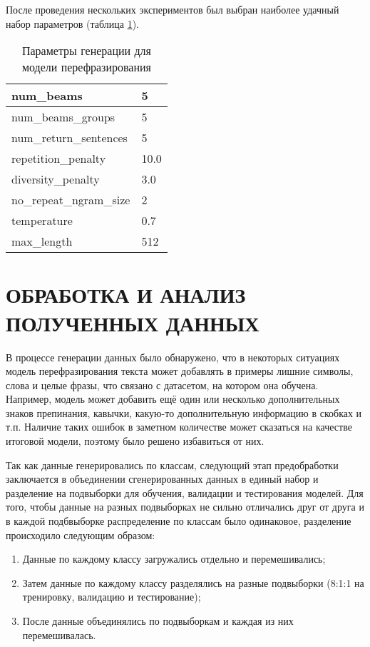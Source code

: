 После проведения нескольких экспериментов был выбран наиболее удачный набор параметров (таблица \ref{tab1:table}).

\begin{table}[H]
   \captionsetup{format=hang, singlelinecheck=false}
   \raggedleft
      \caption{Параметры генерации для модели перефразирования}
      \label{tab1:table}
   \centering        
   \begin{tabular}{|p{10cm}|p{5cm}|}
      \hline
      num\_beams & 5 \\
      \hline
      num\_beams\_groups & 5 \\
      \hline
      num\_return\_sentences & 5 \\
      \hline
      repetition\_penalty & 10.0 \\
      \hline
      diversity\_penalty & 3.0 \\
      \hline
      no\_repeat\_ngram\_size & 2 \\
      \hline
      temperature & 0.7 \\
      \hline
      max\_length & 512 \\
      \hline
   \end{tabular}
\end{table}

\section{ОБРАБОТКА И АНАЛИЗ ПОЛУЧЕННЫХ ДАННЫХ}
В процессе генерации данных было обнаружено, что в некоторых ситуациях модель перефразирования текста может добавлять в примеры лишние символы, 
слова и целые фразы, что связано с датасетом, на котором она обучена. Например, модель может добавить ещё один или несколько дополнительных 
знаков препинания, кавычки, какую-то дополнительную информацию в скобках и т.п. Наличие таких ошибок в заметном количестве может сказаться на 
качестве итоговой модели, поэтому было решено избавиться от них.

Так как данные генерировались по классам, следующий этап предобработки заключается в объединении сгенерированных данных в единый набор и разделение на подвыборки для обучения, валидации и тестирования моделей. Для того, чтобы данные на разных подвыборках не сильно отличались друг от друга и в каждой подбвыборке распределение по классам было одинаковое, разделение происходило следующим образом:
\begin{enumerate}
   \item Данные по каждому классу загружались отдельно и перемешивались;
   \item Затем данные по каждому классу разделялись на разные подвыборки (8:1:1 на тренировку, валидацию и тестирование);
   \item После данные объединялись по подвыборкам и каждая из них перемешивалась. 
\end{enumerate}

